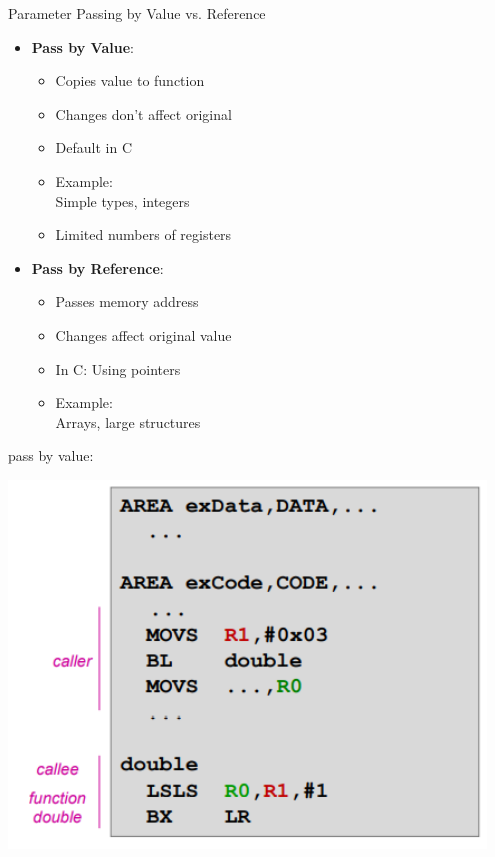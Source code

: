\begin{KR}{Parameter Passing by Value vs. Reference}

\begin{minipage}{0.5\linewidth}
\begin{itemize}
  \item \textbf{Pass by Value}:
    \begin{itemize}
      \item Copies value to function
      \item Changes don't affect original
      \item Default in C
      \item Example: \\Simple types, integers
      \item Limited numbers of registers
    \end{itemize}
  \item \textbf{Pass by Reference}:
    \begin{itemize}
      \item Passes memory address
      \item Changes affect original value
      \item In C: Using pointers
      \item Example: \\Arrays, large structures
    \end{itemize}
\end{itemize}
\end{minipage}
\begin{minipage}{0.5\linewidth}
  \center
pass by value:

\includegraphics[width=\linewidth]{images/register_passbyval.png}
\end{minipage}


\end{KR}
